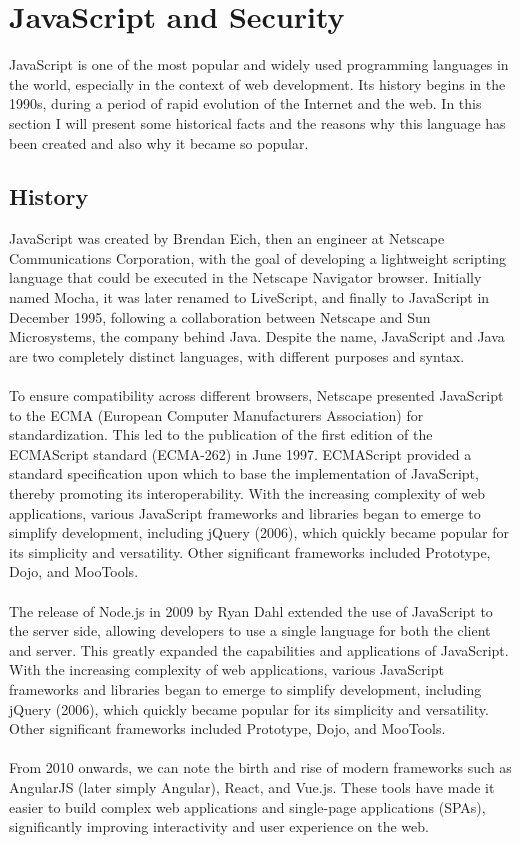 \documentclass{article}
\begin{document}
\newpage
\maketitle
\section{JavaScript and Security}

JavaScript is one of the most popular and widely used programming languages in the world, especially in the context of web development. Its history begins in the 1990s, during a period of rapid evolution of the Internet and the web. In this section I will present some historical facts and the reasons why this language has been created and also why it became so popular.

\subsection{History}
JavaScript was created by Brendan Eich, then an engineer at Netscape Communications Corporation, with the goal of developing a lightweight scripting language that could be executed in the Netscape Navigator browser. Initially named Mocha, it was later renamed to LiveScript, and finally to JavaScript in December 1995, following a collaboration between Netscape and Sun Microsystems, the company behind Java. Despite the name, JavaScript and Java are two completely distinct languages, with different purposes and syntax.
\\
\\
To ensure compatibility across different browsers, Netscape presented JavaScript to the ECMA (European Computer Manufacturers Association) for standardization. This led to the publication of the first edition of the ECMAScript standard (ECMA-262) in June 1997. ECMAScript provided a standard specification upon which to base the implementation of JavaScript, thereby promoting its interoperability. With the increasing complexity of web applications, various JavaScript frameworks and libraries began to emerge to simplify development, including jQuery (2006), which quickly became popular for its simplicity and versatility. Other significant frameworks included Prototype, Dojo, and MooTools.
\\
\\
The release of Node.js in 2009 by Ryan Dahl extended the use of JavaScript to the server side, allowing developers to use a single language for both the client and server. This greatly expanded the capabilities and applications of JavaScript. With the increasing complexity of web applications, various JavaScript frameworks and libraries began to emerge to simplify development, including jQuery (2006), which quickly became popular for its simplicity and versatility. Other significant frameworks included Prototype, Dojo, and MooTools.
\\
\\
From 2010 onwards, we can note the birth and rise of modern frameworks such as AngularJS (later simply Angular), React, and Vue.js. These tools have made it easier to build complex web applications and single-page applications (SPAs), significantly improving interactivity and user experience on the web.
\end{document}
